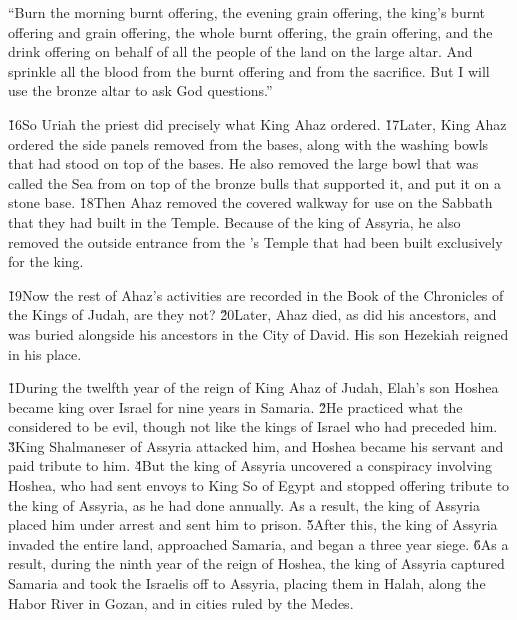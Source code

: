 \begin{poetry}
\poeml ``Burn the morning burnt offering, the evening grain offering, the king's burnt offering and grain offering, the whole burnt offering, the grain offering, and the drink offering on behalf of all the people of the land on the large altar. And sprinkle all the blood from the burnt offering and from the sacrifice. But I will use the bronze altar to ask God questions.''
\end{poetry}

\v{16}So Uriah the priest did precisely what King Ahaz ordered. \v{17}Later, King Ahaz ordered the side panels removed from the bases, along with the washing bowls that had stood on top of the bases. He also removed the large bowl that was called the Sea from on top of the bronze bulls that supported it, and put it on a stone base. \v{18}Then Ahaz removed the covered walkway for use on the Sabbath that they had built in the Temple. Because of the king of Assyria, he also removed the outside entrance from the 's Temple that had been built exclusively for the king.

\v{19}Now the rest of Ahaz's activities are recorded in the Book of the Chronicles of the Kings of Judah, are they not? \v{20}Later, Ahaz died, as did his ancestors, and was buried alongside his ancestors in the City of David. His son Hezekiah reigned in his place.

\v{1}During the twelfth year of the reign of King Ahaz of Judah, Elah's son Hoshea became king over Israel for nine years in Samaria. \v{2}He practiced what the  considered to be evil, though not like the kings of Israel who had preceded him. \v{3}King Shalmaneser of Assyria attacked him, and Hoshea became his servant and paid tribute to him. \v{4}But the king of Assyria uncovered a conspiracy involving Hoshea, who had sent envoys to King So of Egypt and stopped offering tribute to the king of Assyria, as he had done annually. As a result, the king of Assyria placed him under arrest and sent him to prison. \v{5}After this, the king of Assyria invaded the entire land, approached Samaria, and began a three year siege. \v{6}As a result, during the ninth year of the reign of Hoshea, the king of Assyria captured Samaria and took the Israelis off to Assyria, placing them in Halah, along the Habor River in Gozan, and in cities ruled by the Medes.


